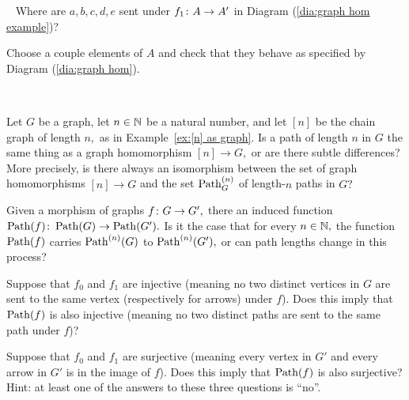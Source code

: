 \documentclass[../main/CT4S-EN-RU]{subfiles}
\begin{document}
\begin{exampleRUS}\label{ex:graph hom}
\end{exampleRUS}

\begin{exerciseENG}~
\sexc Where are $a,b,c,d,e$ sent under $f_1\colon A\rightarrow A'$ in Diagram (\ref{dia:graph hom example})? 
\item Choose a couple elements of $A$ and check that they behave as specified by Diagram (\ref{dia:graph hom}).
\endsexc
\end{exerciseENG}

\begin{exerciseRUS}~
\end{exerciseRUS}

\begin{exerciseENG}
Let $G$ be a graph, let $n\in{\mathbb N}$ be a natural number, and let $[n]$ be the chain graph of length $n,$ as in Example~\ref{ex:[n] as graph}. Is a path of length $n$ in $G$ the same thing as a graph homomorphism $[n]\to G,$ or are there subtle differences? More precisely, is there always an isomorphism between the set of graph homomorphisms $[n]\to G$ and the set $\operatorname{Path}_G^{(n)}$ of length-$n$ paths in $G?$
\end{exerciseENG}

\begin{exerciseRUS}
\end{exerciseRUS}

\begin{exerciseENG}
Given a morphism of graphs $f\colon G\rightarrow G',$ there an induced function $\operatorname{Path}(f)\colon\operatorname{Path}(G)\rightarrow\operatorname{Path}(G').$ 
\sexc Is it the case that for every $n\in{\mathbb N},$ the function $\operatorname{Path}(f)$ carries $\operatorname{Path}^{(n)}(G)$ to $\operatorname{Path}^{(n)}(G'),$ or can path lengths change in this process?
\item Suppose that $f_0$ and $f_1$ are injective (meaning no two distinct vertices in $G$ are sent to the same vertex (respectively for arrows) under $f$). Does this imply that $\operatorname{Path}(f)$ is also injective (meaning no two distinct paths are sent to the same path under $f$)?
\item Suppose that $f_0$ and $f_1$ are surjective (meaning every vertex in $G'$ and every arrow in $G'$ is in the image of $f$). Does this imply that $\operatorname{Path}(f)$ is also surjective? Hint: at least one of the answers to these three questions is “no”.
\endsexc
\end{exerciseENG}

\begin{exerciseRUS}
\end{exerciseRUS}
\end{document}
